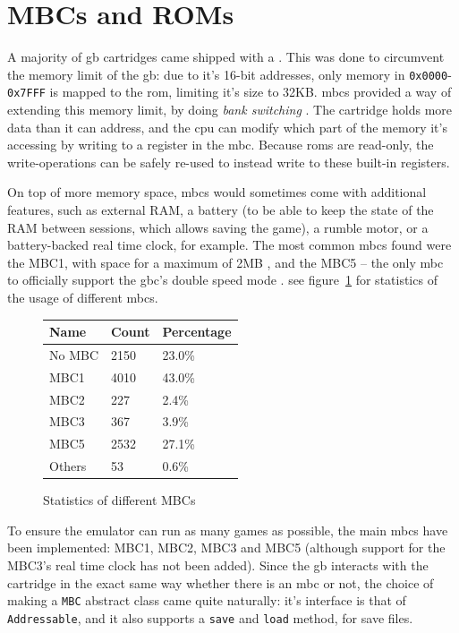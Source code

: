 \documentclass[11pt]{informatics-report}
\begin{document}
\section{MBCs and ROMs}

A majority of \gls{gb} cartridges came shipped with a . This was done to circumvent the memory limit of the \gls{gb}: due to it's 16-bit addresses, only memory in \texttt{0x0000}-\texttt{0x7FFF} is mapped to the \gls{rom}, limiting it's size to 32KB. \glspl{mbc} provided a way of extending this memory limit, by doing \textit{bank switching} \cite[MBCs]{pandoc}. The cartridge holds more data than it can address, and the \gls{cpu} can modify which part of the memory it's accessing by writing to a register in the \gls{mbc}. Because \glspl{rom} are read-only, the write-operations can be safely re-used to instead write to these built-in registers.

On top of more memory space, \glspl{mbc} would sometimes come with additional features, such as external RAM, a battery (to be able to keep the state of the RAM between sessions, which allows saving the game), a rumble motor, or a battery-backed real time clock, for example. The most common \glspl{mbc} found were the MBC1, with space for a maximum of 2MB \cite[MBC1]{pandoc}, and the MBC5 -- the only \gls{mbc} to officially support the \gls{gbc}'s double speed mode \cite{mbc5_only_double}. see figure~\ref{fig:stats-mbc} for statistics of the usage of different \glspl{mbc}.

\begin{figure}[h]
    \centering
    \begin{tabular}{|l|l|l|}
    \hline
    \textbf{Name} & \textbf{Count} & \textbf{Percentage} \\ \hline
    No MBC & 2150 & 23.0\% \\ \hline
    MBC1   & 4010 & 43.0\% \\ \hline
    MBC2   &  227 &  2.4\% \\ \hline
    MBC3   &  367 &  3.9\% \\ \hline
    MBC5   & 2532 & 27.1\% \\ \hline
    Others &   53 &  0.6\% \\ \hline
    \end{tabular}
       \caption{Statistics of different MBCs \cite{gb_rom_db}}
    \label{fig:stats-mbc}
\end{figure}

To ensure the emulator can run as many games as possible, the main \glspl{mbc} have been implemented: MBC1, MBC2, MBC3 and MBC5 (although support for the MBC3's real time clock has not been added). Since the \gls{gb} interacts with the cartridge in the exact same way whether there is an \gls{mbc} or not, the choice of making a \texttt{MBC} abstract class came quite naturally: it's interface is that of \texttt{Addressable}, and it also supports a \texttt{save} and \texttt{load} method, for save files.
\end{document}
